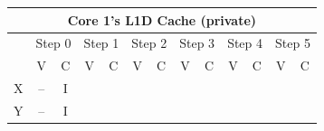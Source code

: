 \documentclass[a4paper,10pt]{article}
\begin{document}
\begin{enumerate}
{        %
        \begin{table}[!hbpt]
        \centering
        \begin{tabular}{|ccccccccccccc|}
        \hline
        \multicolumn{13}{|c|}{Core 1's L1D Cache (private)}                                                                                                                                                                                                                                                                                                                                                                                                             \\ \hline
        \multicolumn{1}{|c|}{}  & \multicolumn{2}{c|}{Step 0}                      & \multicolumn{2}{c|}{\cellcolor[HTML]{C0C0C0}Step 1}                                             & \multicolumn{2}{c|}{Step 2}                     & \multicolumn{2}{c|}{\cellcolor[HTML]{C0C0C0}Step 3}                                             & \multicolumn{2}{c|}{Step 4}                     & \multicolumn{2}{c|}{\cellcolor[HTML]{C0C0C0}Step 5}                        \\ \hline
        \multicolumn{1}{|c|}{}  & \multicolumn{1}{c|}{V}  & \multicolumn{1}{c|}{C} & \multicolumn{1}{c|}{\cellcolor[HTML]{C0C0C0}V} & \multicolumn{1}{c|}{\cellcolor[HTML]{C0C0C0}C} & \multicolumn{1}{c|}{V} & \multicolumn{1}{c|}{C} & \multicolumn{1}{c|}{\cellcolor[HTML]{C0C0C0}V} & \multicolumn{1}{c|}{\cellcolor[HTML]{C0C0C0}C} & \multicolumn{1}{c|}{V} & \multicolumn{1}{c|}{C} & \multicolumn{1}{c|}{\cellcolor[HTML]{C0C0C0}V} & \cellcolor[HTML]{C0C0C0}C \\ \hline
        \multicolumn{1}{|c|}{X} & \multicolumn{1}{c|}{--} & \multicolumn{1}{c|}{I} & \multicolumn{1}{c|}{\cellcolor[HTML]{C0C0C0}}  & \multicolumn{1}{c|}{\cellcolor[HTML]{C0C0C0}}  & \multicolumn{1}{c|}{}  & \multicolumn{1}{c|}{}  & \multicolumn{1}{c|}{\cellcolor[HTML]{C0C0C0}}  & \multicolumn{1}{c|}{\cellcolor[HTML]{C0C0C0}}  & \multicolumn{1}{c|}{}  & \multicolumn{1}{c|}{}  & \multicolumn{1}{c|}{\cellcolor[HTML]{C0C0C0}}  & \cellcolor[HTML]{C0C0C0}  \\ \hline
        \multicolumn{1}{|c|}{Y} & \multicolumn{1}{c|}{--} & \multicolumn{1}{c|}{I} & \multicolumn{1}{c|}{\cellcolor[HTML]{C0C0C0}}  & \multicolumn{1}{c|}{\cellcolor[HTML]{C0C0C0}}  & \multicolumn{1}{c|}{}  & \multicolumn{1}{c|}{}  & \multicolumn{1}{c|}{\cellcolor[HTML]{C0C0C0}}  & \multicolumn{1}{c|}{\cellcolor[HTML]{C0C0C0}}  & \multicolumn{1}{c|}{}  & \multicolumn{1}{c|}{}  & \multicolumn{1}{c|}{\cellcolor[HTML]{C0C0C0}}  & \cellcolor[HTML]{C0C0C0}  \\ \hline
        \end{tabular}
        \end{table}
        
}
\end{enumerate}
\end{document}
